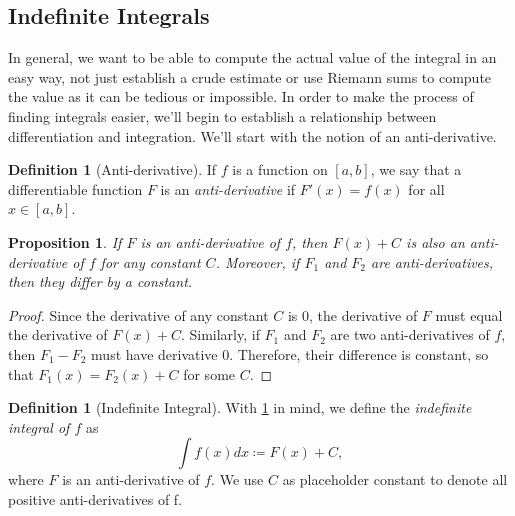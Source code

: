 \documentclass[12pt]{article}
\newtheorem{prop}[thm]{Proposition}
\theoremstyle{definition}
\newtheorem{defn}[thm]{Definition}
\theoremstyle{plain}
\numberwithin{equation}{section}
\begin{document}










\subsection{Indefinite Integrals}


In general, we want to be able to compute the actual value of the integral in an easy way, not just establish a crude estimate or use Riemann sums to compute the value as it can be tedious or impossible. In order to make the process of finding integrals easier, we'll begin to establish a relationship between differentiation and integration. We'll start with the notion of an anti-derivative.
\begin{defn}[Anti-derivative]
If $f$ is a function on $[a,b]$, we say that a differentiable function $F$ is an \emph{anti-derivative} if $F'(x)=f(x)$ for all $x\in [a,b]$.
\end{defn}
\begin{prop}\label{PlusC}
  If $F$ is an anti-derivative of $f$, then $F(x)+C$ is also an anti-derivative of $f$ for any constant $C$. Moreover, if $F_1$ and $F_2$ are anti-derivatives, then they differ by a constant.
\end{prop}
\begin{proof}
  Since the derivative of any constant $C$ is $0$, the derivative of $F$ must equal the derivative of $F(x)+C$. Similarly, if $F_1$ and $F_2$ are two anti-derivatives of $f$, then $F_1-F_2$ must have derivative 0. Therefore, their difference is constant, so that $F_1(x)=F_2(x)+C$ for some $C$.
\end{proof}

\begin{defn}[Indefinite Integral]
With \cref{PlusC} in mind, we define the \emph{indefinite integral of $f$} as
\begin{equation}
  \int f(x)dx\coloneqq F(x)+C,
\end{equation} where $F$ is an anti-derivative of $f$. We use $C$ as placeholder constant to denote all positive anti-derivatives of f.
\end{defn}
\end{document}
